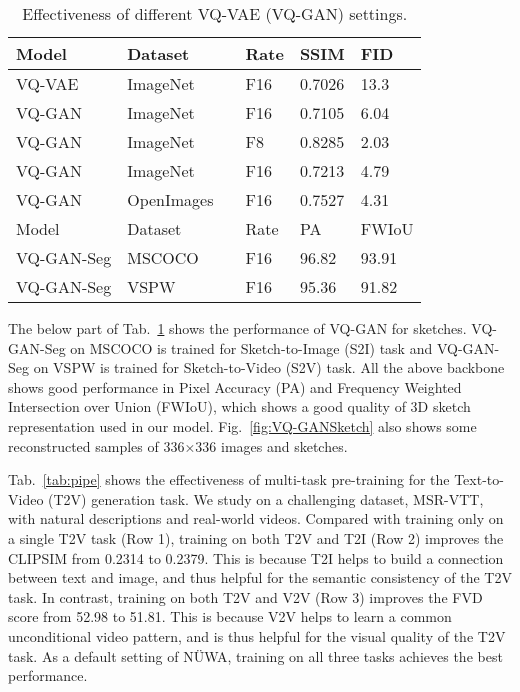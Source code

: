 \documentclass[10pt,twocolumn,letterpaper]{article}
\begin{document}
\begin{table}[t]
\footnotesize
\begin{center}
\caption{Effectiveness of different VQ-VAE (VQ-GAN) settings.}
\label{tab:VQ-GAN}
\tabcolsep=0.1cm
\begin{tabular}{p{1.8cm}p{1.5cm}p{1.8cm}p{0.5cm}p{0.8cm}p{0.8cm}}
\toprule
Model     & Dataset    &  & Rate                    & SSIM   & FID   \\
\midrule
VQ-VAE     & ImageNet   &    &   F16                   & 0.7026 & 13.3 \\
VQ-GAN     & ImageNet   &    &   F16                   & 0.7105 & 6.04  \\
VQ-GAN     & ImageNet   &    &   F8                   & 0.8285 & 2.03  \\
VQ-GAN     & ImageNet   &    &    F16                 & 0.7213 & 4.79  \\
VQ-GAN     & OpenImages &    &    F16                  & 0.7527 & 4.31  \\
\midrule
Model     & Dataset    &  & Rate   & PA     & FWIoU \\
\midrule
VQ-GAN-Seg & MSCOCO     &    &  F16                  & 96.82  & 93.91 \\
VQ-GAN-Seg & VSPW       &    &  F16                 & 95.36  & 91.82 \\
\bottomrule
\end{tabular}
\end{center}
	\vspace{-2mm}
\end{table}




The below part of Tab.~\ref{tab:VQ-GAN} shows the performance of VQ-GAN for sketches. VQ-GAN-Seg on MSCOCO\cite{linMicrosoftCocoCommon2014} is trained for Sketch-to-Image (S2I) task and VQ-GAN-Seg on VSPW\cite{miaoVSPWLargescaleDataset2021} is trained for Sketch-to-Video (S2V) task. All the above backbone shows good performance in Pixel Accuracy (PA) and Frequency Weighted Intersection over Union (FWIoU), which shows a good quality of 3D sketch representation used in our model. Fig.~\ref{fig:VQ-GANSketch} also shows some reconstructed samples of 336×336 images and sketches.



Tab.~\ref{tab:pipe} shows the effectiveness of multi-task pre-training for the Text-to-Video (T2V) generation task. We study on a challenging dataset, MSR-VTT\cite{xuMsrvttLargeVideo2016}, with natural descriptions and real-world videos. Compared with training only on a single T2V task (Row 1), training on both T2V and T2I (Row 2) improves the CLIPSIM from 0.2314 to 0.2379. This is because T2I helps to build a connection between text and image, and thus helpful for the semantic consistency of the T2V task. In contrast, training on both T2V and V2V (Row 3) improves the FVD score from 52.98 to 51.81. This is because V2V helps to learn a common unconditional video pattern, and is thus helpful for the visual quality of the T2V task. As a default setting of NÜWA, training on all three tasks achieves the best performance.
\end{document}
